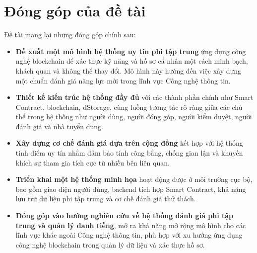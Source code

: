 \section{Đóng góp của đề tài}
Đề tài mang lại những đóng góp chính sau:

\begin{itemize}
  \item \textbf{Đề xuất một mô hình hệ thống uy tín phi tập trung} ứng dụng công nghệ blockchain để xác thực kỹ năng và hồ sơ cá nhân một cách minh bạch, khách quan và không thể thay đổi. Mô hình này hướng đến việc xây dựng một chuẩn đánh giá năng lực mới trong lĩnh vực Công nghệ thông tin.
  \item \textbf{Thiết kế kiến trúc hệ thống đầy đủ} với các thành phần chính như Smart Contract, blockchain, dStorage, cùng luồng tương tác rõ ràng giữa các chủ thể trong hệ thống như người dùng, người đóng góp, người kiểm duyệt, người đánh giá và nhà tuyển dụng.
  \item \textbf{Xây dựng cơ chế đánh giá dựa trên cộng đồng} kết hợp với hệ thống tính điểm uy tín nhằm đảm bảo tính công bằng, chống gian lận và khuyến khích sự tham gia tích cực từ nhiều bên liên quan.
  \item \textbf{Triển khai một hệ thống minh họa} hoạt động được ở môi trường cục bộ, bao gồm giao diện người dùng, backend tích hợp Smart Contract, khả năng lưu trữ dữ liệu phi tập trung và cơ chế đánh giá thử thách.
  \item \textbf{Đóng góp vào hướng nghiên cứu về hệ thống đánh giá phi tập trung và quản lý danh tiếng}, mở ra khả năng mở rộng mô hình cho các lĩnh vực khác ngoài Công nghệ thông tin, phù hợp với xu hướng ứng dụng công nghệ blockchain trong quản lý dữ liệu và xác thực hồ sơ.
\end{itemize}
